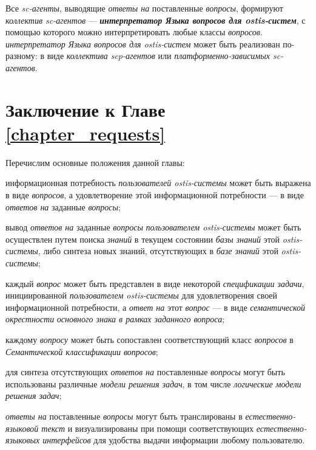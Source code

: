 Все \textit{sc-агенты}, выводящие \textit{ответы на} поставленные \textit{вопросы}, формируют \textit{коллектив sc-агентов} --- \textbf{\textit{интерпретатор Языка вопросов для ostis-систем}}, с помощью которого можно интерпретировать любые классы \textit{вопросов}. \textit{интерпретатор Языка вопросов для ostis-систем} может быть реализован по-разному: в виде \textit{коллектива scp-агентов} или \textit{платформенно-зависимых sc-агентов}.

\section*{Заключение к Главе \ref{chapter_requests}}

Перечислим основные положения данной главы:
\begin{textitemize}
	\item информационная потребность \textit{пользователей ostis-системы} может быть выражена в виде \textit{вопросов}, а удовлетворение этой информационной потребности --- в виде \textit{ответов на} заданные \textit{вопросы};
	\item вывод \textit{ответов на} заданные \textit{вопросы} \textit{пользователем ostis-системы} может быть осуществлен путем поиска \textit{знаний} в текущем состоянии \textit{базы знаний} этой \textit{ostis-системы}, либо синтеза новых знаний, отсутствующих в \textit{базе знаний} этой \textit{ostis-системы};
	\item каждый \textit{вопрос} может быть представлен в виде некоторой \textit{спецификации задачи}, инициированной \textit{пользователем ostis-системы} для удовлетворения своей информационной потребности, а \textit{ответ на} этот \textit{вопрос} --- в виде \textit{семантической окрестности} \textit{основного знака в рамках заданного вопроса};
	\item каждому \textit{вопросу} может быть сопоставлен соответствующий класс \textit{вопросов} в \textit{Семантической классификации вопросов};
	\item для синтеза отсутствующих \textit{ответов на} поставленные \textit{вопросы} могут быть использованы различные \textit{модели решения задач}, в том числе \textit{логические модели решения задач};
	\item \textit{ответы на} поставленные \textit{вопросы} могут быть транслированы в \textit{естественно-языковой текст} и визуализированы при помощи соответствующих \textit{естественно-языковых интерфейсов} для удобства выдачи информации любому пользователю.
\end{textitemize}

%